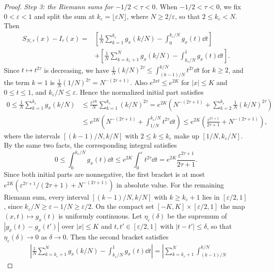\begin{proof}
\emph{Step 3: the Riemann sums for $-1/2<\tau<0$.}
When $-1/2<\tau<0$, we fix $0<\varepsilon<1$ and split the sum at
$k_\varepsilon=\lfloor\varepsilon N\rfloor$, where $N\geq2/\varepsilon$,
so that $2\leq k_\varepsilon<N$. Then
\begin{align*}
 S_{N,\tau}(x)-I_\tau(x)
 ={}&\left[\frac1N\sum_{k=1}^{k_\varepsilon}g_x(k/N)
      -\int_0^{k_\varepsilon/N}g_x(t)\dd t\right]\\
 &+\left[\frac1N\sum_{k=k_\varepsilon+1}^Ng_x(k/N)
      -\int_{k_\varepsilon/N}^1g_x(t)\dd t\right].
\end{align*}
Since $t\mapsto t^{2\tau}$ is decreasing, we have
$\frac1N(k/N)^{2\tau}\leq\int_{(k-1)/N}^{k/N}t^{2\tau}\dd t$ for
$k\geq2$, and the term $k=1$ is $\frac1N(1/N)^{2\tau}=N^{-(2\tau+1)}$.
Also $e^{2xt}\leq e^{2K}$ for $|x|\leq K$ and $0\leq t\leq1$, and
$k_\varepsilon/N\leq\varepsilon$. Hence the normalized initial part
satisfies
\begin{align*}
 0\leq\frac1N\sum_{k=1}^{k_\varepsilon}g_x(k/N)
 &\leq\frac{e^{2K}}N\sum_{k=1}^{k_\varepsilon}(k/N)^{2\tau}
 =e^{2K}\left(N^{-(2\tau+1)}
    +\sum_{k=2}^{k_\varepsilon}\frac1N(k/N)^{2\tau}\right)\\
 &\leq e^{2K}\left(N^{-(2\tau+1)}
    +\int_{1/N}^{k_\varepsilon/N}t^{2\tau}\dd t\right)
 \leq e^{2K}\left(\frac{\varepsilon^{2\tau+1}}{2\tau+1}
                  +N^{-(2\tau+1)}\right),
\end{align*}
where the intervals $[(k-1)/N,k/N]$ with $2\leq k\leq k_\varepsilon$ make
up $[1/N,k_\varepsilon/N]$.
By the same two facts, the corresponding integral satisfies
\[
 0\leq\int_0^{k_\varepsilon/N}g_x(t)\dd t
 \leq e^{2K}\int_0^\varepsilon t^{2\tau}\dd t
 =e^{2K}\frac{\varepsilon^{2\tau+1}}{2\tau+1}.
\]
Since both initial parts are nonnegative, the first bracket is at most
$e^{2K}(\varepsilon^{2\tau+1}/(2\tau+1)+N^{-(2\tau+1)})$ in absolute value.
For the remaining Riemann sum, every interval $[(k-1)/N,k/N]$ with
$k\geq k_\varepsilon+1$ lies in $[\varepsilon/2,1]$, since
$k_\varepsilon/N\geq\varepsilon-1/N\geq\varepsilon/2$. On the compact set
$[-K,K]\times[\varepsilon/2,1]$ the map $(x,t)\mapsto g_x(t)$ is
uniformly continuous. Let $\eta_\varepsilon(\delta)$ be the
supremum of $|g_x(t)-g_x(t')|$ over $|x|\leq K$ and
$t,t'\in[\varepsilon/2,1]$ with $|t-t'|\leq\delta$, so that
$\eta_\varepsilon(\delta)\to0$ as $\delta\to0$. Then the second bracket
satisfies
\begin{align*}
 &\left|\frac1N\sum_{k=k_\varepsilon+1}^Ng_x(k/N)
      -\int_{k_\varepsilon/N}^1g_x(t)\dd t\right|
 =\left|\sum_{k=k_\varepsilon+1}^N\int_{(k-1)/N}^{k/N}

\end{align*}
\end{proof}

